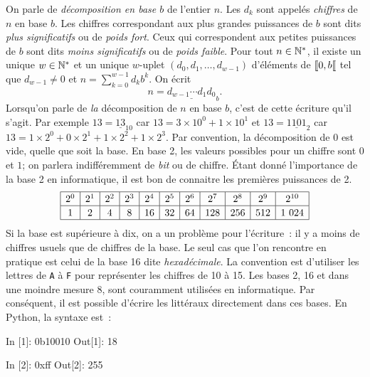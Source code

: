 \documentclass{magnoliaold}
\begin{document}
\begin{remarques}
\remarque On parle de \emph{décomposition en base $b$} de l'entier $n$. Les $d_k$ sont appelés
  \emph{chiffres} de $n$ en base $b$.
\remarque Les chiffres correspondant aux plus grandes puissances de $b$ sont dits
    \emph{plus significatifs} ou de \emph{poids fort}. Ceux qui correspondent aux
    petites puissances de $b$ sont dits \emph{moins significatifs} ou de
    \emph{poids faible}.
\remarque Pour tout $n\in{\mathbb{N}^*}$, il existe un unique $w\in{\mathbb{N}^*}$ et un unique
  $w$-uplet $(d_0,d_1,\ldots,d_{w-1})$ d'éléments de $\left\llbracket 0,b\right\llbracket$ tel que
  $d_{w-1}\neq 0$ et $n=\sum_{k=0}^{w-1} d_k b^k$. On écrit
  \[n=\underline{d_{w-1}\cdots d_1 d_0}_{b}.\]
  Lorsqu'on parle de \emph{la} décomposition de $n$ en base $b$, c'est de cette écriture
  qu'il s'agit. 
  Par exemple $13=\underline{13}_{10}$ car $13=3\times 10^0 + 1\times 10^1$ et
  $13=\underline{1101}_{2}$ car $13=1\times 2^0+0\times 2^1+1\times 2^2+1\times 2^3$. Par convention, la décomposition de 0 est vide, quelle que soit la base.
\remarque En base 2, les valeurs possibles pour un chiffre sont $0$ et $1$; on
  parlera indifféremment de \emph{bit} ou de chiffre. Étant donné l'importance de la
  base 2 en informatique, il est bon de connaitre les premières puissances de 2.
  \[\begin{array}{|c|c|c|c|c|c|c|c|c|c|c|}
  \hline
  \raisebox{10pt}{} 2^0 & 2^1 & 2^2 & 2^3 & 2^4 & 2^5 & 2^6 & 2^7 & 2^8 & 2^9 & 2^{10} \\
  \hline
  \raisebox{10pt}{} 1 & 2 & 4 & 8 & 16 & 32 & 64 & 128 & 256 & 512 & 1\ 024 \\
  \hline
  \end{array}\]
\remarque Si la base est supérieure à dix, on a un problème pour l'écriture~: il y a moins
  de chiffres usuels que de chiffres de la base. Le seul cas que l'on rencontre en pratique
  est celui de la base 16 dite \emph{hexadécimale}. La convention est d'utiliser les lettres
  de \verb!A! à \verb!F! pour représenter les chiffres de 10 à 15. 
\remarque Les bases 2, 16 et dans une moindre mesure 8, sont couramment utilisées
  en informatique. Par conséquent, il est possible d'écrire les littéraux directement dans
  ces bases. En Python, la syntaxe est~:
\begin{pythoncode}
In [1]: 0b10010
Out[1]: 18

In [2]: 0xff
Out[2]: 255


\end{pythoncode}
\end{remarques}
\end{document}
